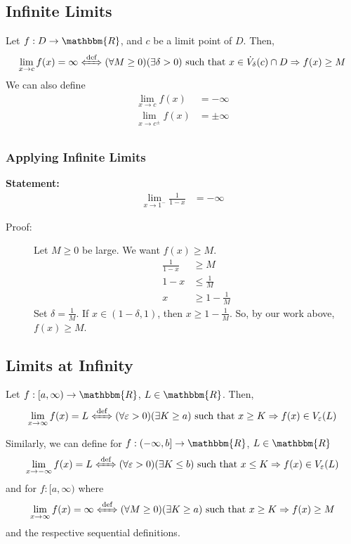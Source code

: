 \documentclass[10pt]{extarticle}
\newcommand{\R}{\mathbbm{R}}
\begin{document}
  \subsection{Infinite Limits}%
    Let $f: D\rightarrow \R$, and $c$ be a limit point of $D$. Then,
    \begin{align*}
      \lim_{x\rightarrow c}f(x) = \infty \xLeftrightarrow{\text{def}} (\forall M \geq 0)(\exists \delta > 0) \text{ such that } x\in \dot{V}_{\delta}(c)\cap D \Rightarrow f(x) \geq M
    \end{align*}
    We can also define
    \begin{align*}
      \lim_{x\rightarrow c}f(x) &= -\infty\\
      \lim_{x\rightarrow c^{\pm}}f(x) &= \pm \infty\\
    \end{align*}
    \subsubsection{Applying Infinite Limits}%
    \textbf{Statement:} \begin{align*}
      \lim_{x\rightarrow 1^{-}}\frac{1}{1-x} &= -\infty
    \end{align*}
    \begin{description}
      \item[Proof:] Let $M\geq 0$ be large. We want $f(x) \geq M$.
        \begin{align*}
          \frac{1}{1-x} &\geq M\\
          1-x &\leq \frac{1}{M}\\
          x &\geq 1-\frac{1}{M}
        \end{align*}
        Set $\delta = \frac{1}{M}$. If $x\in (1-\delta,1)$, then $x\geq 1-\frac{1}{M}$. So, by our work above, $f(x) \geq M$.
    \end{description}
  \subsection{Limits at Infinity}%
    Let $f: [a,\infty) \rightarrow \R$, $L\in\R$. Then,
    \begin{align*}
      \lim_{x\rightarrow \infty}f(x) = L \xLeftrightarrow{\text{def}} (\forall \varepsilon > 0)(\exists K \geq a) \text{ such that } x\geq K \Rightarrow f(x)\in V_{\varepsilon}(L)
    \end{align*}

    Similarly, we can define for $f: (-\infty,b] \rightarrow \R$, $L\in \R$
    \begin{align*}
      \lim_{x\rightarrow -\infty} f(x) = L \xLeftrightarrow{\text{def}} (\forall \varepsilon > 0)(\exists K\leq b) \text{ such that } x\leq K \Rightarrow f(x)\in V_{\varepsilon}(L)
    \end{align*}
    and for $f: [a,\infty)$ where
    \begin{align*}
      \lim_{x\rightarrow\infty}f(x) = \infty \xLeftrightarrow{\text{def}} (\forall M \geq 0)(\exists K\geq a) \text{ such that } x\geq K \Rightarrow f(x) \geq M
    \end{align*}
    and the respective sequential definitions.
\end{document}
